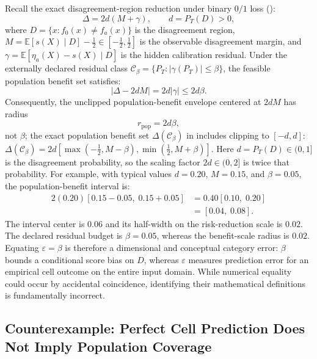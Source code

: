 Recall the exact disagreement-region reduction under binary $0/1$ loss ():
\begin{equation}
 \Delta = 2d(M + \gamma), \qquad d = P_T(D) > 0,
 \label{eq:app-reduction}
\end{equation}
where $D = \{x : f_0(x) \neq f_a(x)\}$ is the disagreement region,
$M = \mathbb E[s(X) \mid D] - \frac{1}{2} \in [-\frac{1}{2}, \frac{1}{2}]$ is the observable disagreement margin,
and $\gamma = \mathbb E[\eta_a(X) - s(X) \mid D]$ is the hidden calibration residual. Under the externally declared
residual class $\mathcal C_\beta = \{P_T : |\gamma(P_T)| \le \beta\}$, the feasible population benefit set satisfies:
\begin{equation}
 |\Delta - 2dM| = 2d|\gamma| \le 2d\beta.
\end{equation}
Consequently, the unclipped population-benefit envelope centered at $2dM$ has radius
\begin{equation}
 r_{\mathrm{pop}} = 2d\beta,
\end{equation}
not $\beta$; the exact population benefit set $\Delta(\mathcal C_\beta)$ in 
includes clipping to $[-d, d]$: $\Delta(\mathcal C_\beta) = 2d[\max(-\tfrac12, M-\beta), \min(\tfrac12, M+\beta)]$.
Here $d = P_T(D) \in (0, 1]$ is the disagreement probability, so the scaling factor $2d \in (0, 2]$ is twice that probability.
For example, with typical values $d = 0.20$, $M = 0.15$, and $\beta = 0.05$, the population-benefit interval is:
\begin{align*}
 2(0.20)[0.15 - 0.05, \; 0.15 + 0.05] &= 0.40[0.10, \; 0.20] \\
 &= [0.04, \; 0.08].
\end{align*}
The interval center is $0.06$ and its half-width on the risk-reduction scale is $0.02$. The declared residual
budget is $\beta = 0.05$, whereas the benefit-scale radius is $0.02$. Equating $\varepsilon = \beta$ is therefore
a dimensional and conceptual category error: $\beta$ bounds a conditional score bias on $D$, whereas $\varepsilon$
measures prediction error for an empirical cell outcome on the entire input domain. While numerical equality
could occur by accidental coincidence, identifying their mathematical definitions is fundamentally incorrect.

\subsection{Counterexample: Perfect Cell Prediction Does Not Imply Population Coverage}
\label{app:cell-counterexample}

